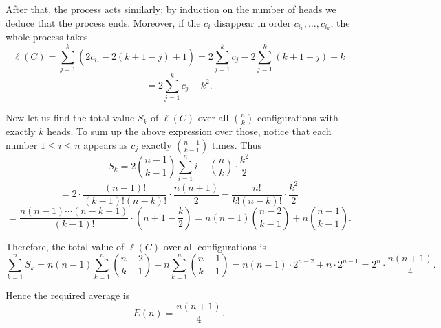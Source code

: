 After that, the process acts similarly; by induction on the number of heads we deduce that the process ends. Moreover, if the \( c_i \) disappear in order \( c_{i_1}, \ldots, c_{i_k} \), the whole process takes
\[
\ell(C) = \sum_{j=1}^{k} \left( 2c_{i_j} - 2(k + 1 - j) + 1 \right) = 2\sum_{j=1}^{k} c_j - 2\sum_{j=1}^{k} (k + 1 - j) + k
\]
\[
= 2\sum_{j=1}^{k} c_j - k^2.
\]

Now let us find the total value \( S_k \) of \( \ell(C) \) over all \( \binom{n}{k} \) configurations with exactly \( k \) heads. To sum up the above expression over those, notice that each number \( 1 \leq i \leq n \) appears as \( c_j \) exactly \( \binom{n-1}{k-1} \) times. Thus
\[
S_k = 2 \binom{n-1}{k-1} \sum_{i=1}^{n} i - \binom{n}{k} \cdot \frac{k^2}{2}
\]
\[
= 2 \cdot \frac{(n - 1)!}{(k - 1)! (n - k)!} \cdot \frac{n(n + 1)}{2} - \frac{n!}{k!(n - k)!} \cdot \frac{k^2}{2}
\]
\[
= \frac{n(n - 1)\cdots(n - k + 1)}{(k - 1)!} \cdot (n + 1 - \frac{k}{2})
= n(n - 1) \binom{n - 2}{k - 1} + n \binom{n - 1}{k - 1}.
\]

Therefore, the total value of \( \ell(C) \) over all configurations is
\[
\sum_{k=1}^{n} S_k = n(n - 1) \sum_{k=1}^{n} \binom{n - 2}{k - 1} + n \sum_{k=1}^{n} \binom{n - 1}{k - 1}
= n(n - 1) \cdot 2^{n-2} + n \cdot 2^{n-1} = 2^n \cdot \frac{n(n + 1)}{4}.
\]

Hence the required average is
\[
E(n) = \frac{n(n + 1)}{4}.
\]